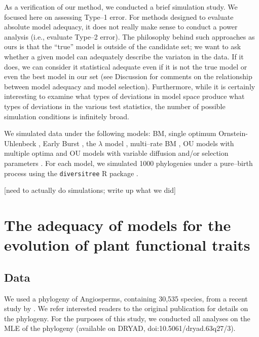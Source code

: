 \documentclass[a4paper,11pt]{article}
\begin{document}
As a verification of our method, we conducted a brief simulation study. We focused here on assessing Type--1 error. For methods designed to evaluate absolute model adequacy, it does not really make sense to conduct a power analysis (i.e., evaluate Type--2 error). The philosophy behind such approaches as ours is that the ``true'' model is outside of the candidate set; we want to ask whether a given model can adequately describe the variaton in the data. If it does, we can consider it statistical adequate even if it is not the true model or even the best model in our set (see Discussion for comments on the relationship between model adequacy and model selection). Furthermore, while it is certainly interesting to examine what types of deviations in model space produce what types of deviations in the various test statistics, the number of possible simulation conditions is infinitely broad.

We simulated data under the following models: BM, single optimum Ornstein-Uhlenbeck \citep[OU;][]{Felsenstein1988, Hansen1997}, Early Burst \citep{Blomberg2003, Harmon2010}, the $\lambda$ model \citep{Pagel1999, Freckleton2002}, multi--rate BM \citep{Omeara2006, Eastman2011}, OU models with multiple optima \citep{ButlerKing2004} and OU models with variable diffusion and/or selection parameters \citep{Beaulieu2012}. For each model, we simulated 1000 phylogenies under a pure--birth process using the \texttt{diversitree} R package \citep{FitzJohn2012}.

[need to actually do simulations; write up what we did]

\section{The adequacy of models for the evolution of plant functional traits}

\subsection{Data}
We used a phylogeny of Angiosperms, containing 30,535 species, from a recent study by \citet{Zanne2013}. We refer interested readers to the original publication for details on the phylogeny. For the purposes of this study, we conducted all analyses on the MLE of the phylogeny (available on DRYAD, doi:10.5061/dryad.63q27/3).
\end{document}
